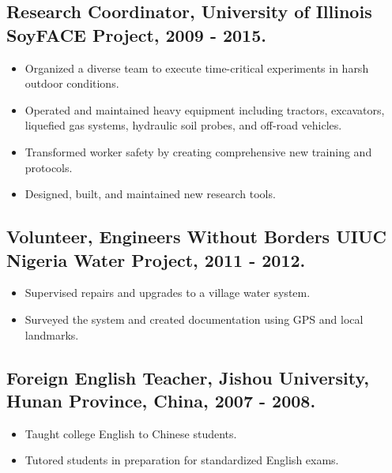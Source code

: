 \documentclass[letterpaper]{article}
\begin{document}
  \subsection*{Research Coordinator, University of Illinois SoyFACE Project, 2009 - 2015.}

    \begin{itemize}

      \item Organized a diverse team to execute time-critical experiments in harsh outdoor conditions.
      \item Operated and maintained heavy equipment including tractors, excavators, liquefied gas systems, hydraulic soil probes, and off-road vehicles.
      \item Transformed worker safety by creating comprehensive new training and protocols.
      \item Designed, built, and maintained new research tools.

    \end{itemize}
  
  \subsection*{Volunteer, Engineers Without Borders UIUC Nigeria Water Project, 2011 - 2012.}
    
    \begin{itemize}
      
      \item Supervised repairs and upgrades to a village water system.
      \item Surveyed the system and created documentation using GPS and local landmarks.
      
    \end{itemize}

  \subsection*{Foreign English Teacher, Jishou University, Hunan Province, China, 2007 - 2008.}
    
    \begin{itemize}
        
      \item Taught college English to Chinese students.
      \item Tutored students in preparation for standardized English exams.
      
    \end{itemize}
\end{document}
